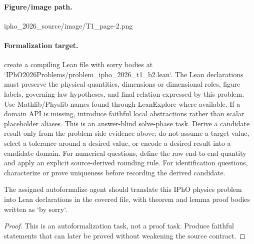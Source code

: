 \paragraph{Figure/image path.}
ipho\_2026\_source/image/T1\_page-2.png

\paragraph{Formalization target.}
create a compiling Lean file with sorry bodies at `IPhO2026Problems/problem\_ipho\_2026\_t1\_b2.lean`.
The Lean declarations must preserve the physical quantities, dimensions or dimensional roles, figure labels, governing-law hypotheses, and final relation expressed by this problem.
Use Mathlib/Physlib names found through LeanExplore where available. If a domain API is missing, introduce faithful local abstractions rather than scalar placeholder aliases.
This is an answer-blind solve-phase task. Derive a candidate result only from the problem-side evidence above; do not assume a target value, select a tolerance around a desired value, or encode a desired result into a candidate domain.
For numerical questions, define the raw end-to-end quantity and apply an explicit source-derived rounding rule. For identification questions, characterize or prove uniqueness before recording the derived candidate.

\begin{theorem}
\label{thm:physics:ipho_2026_t1_b2:target}
The assigned autoformalize agent should translate this IPhO physics problem into Lean declarations in the covered file, with theorem and lemma proof bodies written as `by sorry`.
\end{theorem}
\begin{proof}
This is an autoformalization task, not a proof task. Produce faithful statements that can later be proved without weakening the source contract.
\end{proof}
